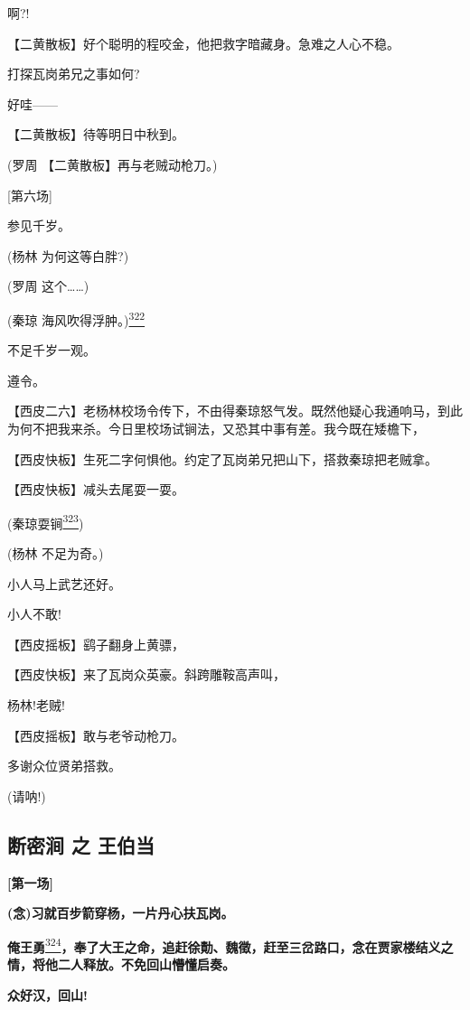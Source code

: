 啊?!

【二黄散板】好个聪明的程咬金，他把救字暗藏身。急难之人心不稳。

打探瓦岗弟兄之事如何?

好哇------

【二黄散板】待等明日中秋到。

(罗周 【二黄散板】再与老贼动枪刀。)

{[}第六场{]}

参见千岁。

(杨林 为何这等白胖?)

(罗周 这个\ldots{}\ldots{})

(秦琼 海风吹得浮肿。)\protect\hyperlink{fn322}{\textsuperscript{322}}

不足千岁一观。

遵令。

【西皮二六】老杨林校场令传下，不由得秦琼怒气发。既然他疑心我通响马，到此为何不把我来杀。今日里校场试锏法，又恐其中事有差。我今既在矮檐下，

【西皮快板】生死二字何惧他。约定了瓦岗弟兄把山下，搭救秦琼把老贼拿。

【西皮快板】减头去尾耍一耍。

(秦琼耍锏\protect\hyperlink{fn323}{\textsuperscript{323}})

(杨林 不足为奇。)

小人马上武艺还好。

小人不敢!

【西皮摇板】鹞子翻身上黄骠，

【西皮快板】来了瓦岗众英豪。斜跨雕鞍高声叫，

杨林!老贼!

【西皮摇板】敢与老爷动枪刀。

多谢众位贤弟搭救。

(请呐!)

\hypertarget{ux65adux5bc6ux6da7-ux4e4b-ux738bux4f2fux5f53}{%
\subsection{断密涧 之
王伯当}\label{ux65adux5bc6ux6da7-ux4e4b-ux738bux4f2fux5f53}}

\textbf{{[}第一场{]}}

\textbf{(念)习就百步箭穿杨，一片丹心扶瓦岗。}

\textbf{俺王勇}\protect\hyperlink{fn324}{\textsuperscript{324}}\textbf{，奉了大王之命，追赶徐勣、魏徵，赶至三岔路口，念在贾家楼结义之情，将他二人释放。不免回山懵懂启奏。}

\textbf{众好汉，回山!}

